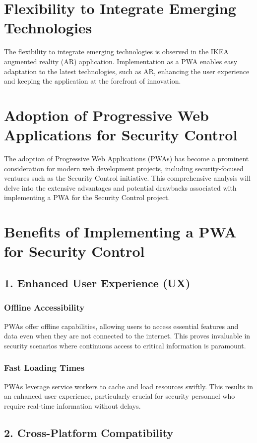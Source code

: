 \documentclass[journal]{IEEEtran}
\begin{document}
	\section*{Flexibility to Integrate Emerging Technologies}
	The flexibility to integrate emerging technologies is observed in the IKEA augmented reality (AR) application. Implementation as a PWA enables easy adaptation to the latest technologies, such as AR, enhancing the user experience and keeping the application at the forefront of innovation.
	
	\section*{Adoption of Progressive Web Applications for Security Control}
	The adoption of Progressive Web Applications (PWAs) has become a prominent consideration for modern web development projects, including security-focused ventures such as the Security Control initiative. This comprehensive analysis will delve into the extensive advantages and potential drawbacks associated with implementing a PWA for the Security Control project.
	
	\section*{Benefits of Implementing a PWA for Security Control}
	\subsection*{1. Enhanced User Experience (UX)}
	\subsubsection*{Offline Accessibility}
	PWAs offer offline capabilities, allowing users to access essential features and data even when they are not connected to the internet. This proves invaluable in security scenarios where continuous access to critical information is paramount.
	\subsubsection*{Fast Loading Times}
	PWAs leverage service workers to cache and load resources swiftly. This results in an enhanced user experience, particularly crucial for security personnel who require real-time information without delays.
	
	\subsection*{2. Cross-Platform Compatibility}
\end{document}
